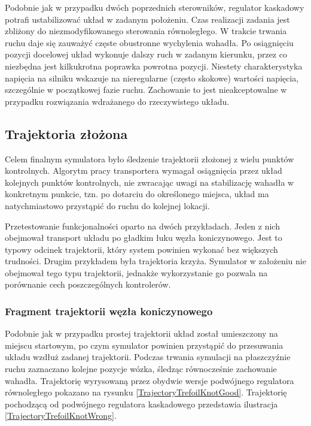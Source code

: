 \documentclass[12pt, twoside, openany]{report}
\theoremstyle{definition}
\begin{document}
Podobnie jak w przypadku dwóch poprzednich sterowników, regulator kaskadowy potrafi ustabilizować układ w zadanym położeniu. Czas realizacji zadania jest zbliżony do niezmodyfikowanego sterowania równoległego. W trakcie trwania ruchu daje się zauważyć częste obustronne wychylenia wahadła. Po osiągnięciu pozycji docelowej układ wykonuje dalszy ruch w zadanym kierunku, przez co niezbędna jest kilkukrotna poprawka powrotna pozycji. Niestety charakterystyka napięcia na silniku wskazuje na nieregularne (często skokowe) wartości napięcia, szczególnie w początkowej fazie ruchu. Zachowanie to jest nieakceptowalne w przypadku rozwiązania wdrażanego do rzeczywistego układu. 

\subsection{Trajektoria złożona}
Celem finalnym symulatora było śledzenie trajektorii złożonej z wielu punktów kontrolnych. Algorytm pracy transportera wymagał osiągnięcia przez układ kolejnych punktów kontrolnych, nie zwracając uwagi na stabilizację wahadła w konkretnym punkcie, tzn. po dotarciu do określonego miejsca, układ ma natychmiastowo przystąpić do ruchu do kolejnej lokacji. 

Przetestowanie funkcjonalności oparto na dwóch przykładach. Jeden z nich obejmował transport układu po gładkim łuku węzła koniczynowego. Jest to typowy odcinek trajektorii, który system powinien wykonać bez większych trudności. Drugim przykładem była trajektoria krzyża. Symulator w założeniu nie obejmował tego typu trajektorii, jednakże wykorzystanie go pozwala na porównanie cech poszczególnych kontrolerów. 

\subsubsection{Fragment trajektorii węzła koniczynowego}
Podobnie jak w przypadku prostej trajektorii układ został umieszczony na miejscu startowym, po czym symulator powinien przystąpić do przesuwania układu wzdłuż zadanej trajektorii. Podczas trwania symulacji na płaszczyźnie ruchu zaznaczano kolejne pozycje wózka, śledząc równocześnie zachowanie wahadła. Trajektorię wyrysowaną przez obydwie wersje podwójnego regulatora równoległego pokazano na rysunku \ref{TrajectoryTrefoilKnotGood}. Trajektorię pochodzącą od podwójnego regulatora kaskadowego przedstawia ilustracja \ref{TrajectoryTrefoilKnotWrong}.
\end{document}
